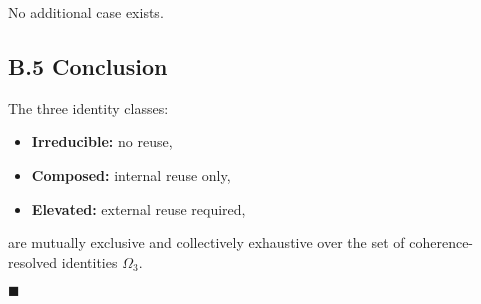 No additional case exists.

\subsection*{B.5 \quad Conclusion}

The three identity classes:

\begin{itemize}
    \item \textbf{Irreducible:} no reuse,
    \item \textbf{Composed:} internal reuse only,
    \item \textbf{Elevated:} external reuse required,
\end{itemize}

are mutually exclusive and collectively exhaustive over the set of coherence-resolved identities $\Omega_3$.

\hfill $\blacksquare$
